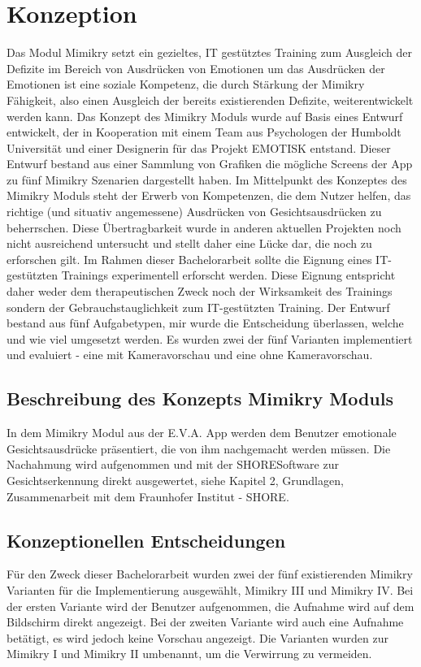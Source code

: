 \section{Konzeption}
Das Modul Mimikry setzt ein gezieltes, IT gestütztes Training zum Ausgleich der Defizite im  Bereich von Ausdrücken von Emotionen um das Ausdrücken der Emotionen ist eine soziale Kompetenz, die durch Stärkung der Mimikry Fähigkeit, also einen Ausgleich der bereits existierenden Defizite, weiterentwickelt werden kann. Das Konzept des Mimikry Moduls wurde auf Basis eines Entwurf entwickelt, der in Kooperation mit einem Team aus Psychologen der Humboldt Universität und einer Designerin für das Projekt EMOTISK entstand. Dieser Entwurf bestand aus einer Sammlung von Grafiken die mögliche Screens der App zu fünf Mimikry Szenarien dargestellt haben. 
Im Mittelpunkt des Konzeptes des Mimikry Moduls steht der Erwerb von Kompetenzen, die dem Nutzer helfen, das richtige (und situativ angemessene) Ausdrücken von Gesichtsausdrücken zu beherrschen. Diese Übertragbarkeit wurde in anderen aktuellen Projekten noch nicht ausreichend untersucht und stellt daher eine Lücke dar, die noch zu erforschen gilt. 
Im Rahmen dieser Bachelorarbeit sollte die Eignung eines IT-gestützten Trainings experimentell erforscht werden. Diese Eignung entspricht daher weder dem therapeutischen Zweck noch der Wirksamkeit des Trainings sondern der Gebrauchstauglichkeit zum IT-gestützten Training. Der Entwurf bestand aus fünf Aufgabetypen, mir wurde die Entscheidung überlassen, welche und wie viel umgesetzt werden. Es wurden zwei der fünf Varianten implementiert und evaluiert - eine mit Kameravorschau und eine ohne Kameravorschau. 
\subsection{Beschreibung des Konzepts Mimikry Moduls}
In dem Mimikry Modul aus der E.V.A. App werden dem Benutzer emotionale Gesichtsausdrücke präsentiert, die von ihm nachgemacht werden müssen. Die Nachahmung wird aufgenommen und mit der SHORE\re Software zur Gesichtserkennung direkt ausgewertet, siehe Kapitel 2, Grundlagen, Zusammenarbeit mit dem Fraunhofer Institut - SHORE\re.
\subsection{Konzeptionellen Entscheidungen}
Für den Zweck dieser Bachelorarbeit wurden zwei der fünf existierenden Mimikry Varianten für die Implementierung ausgewählt, Mimikry III und Mimikry IV. 
Bei der ersten Variante wird der Benutzer aufgenommen, die Aufnahme wird auf dem Bildschirm direkt angezeigt. Bei der zweiten Variante wird auch eine Aufnahme betätigt, es wird jedoch keine Vorschau angezeigt. Die Varianten wurden zur Mimikry I und Mimikry II umbenannt, um die Verwirrung zu vermeiden. 

